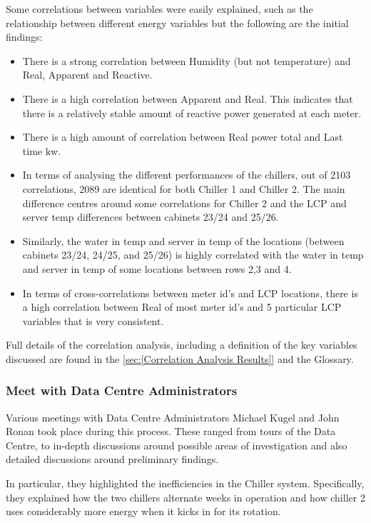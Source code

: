\documentclass[12pt]{scrartcl}
\begin{document}
Some correlations between variables were easily explained, such as the relationship between different energy variables but the following are the initial findings:    

\begin{itemize}
\item There is a strong correlation between Humidity (but not temperature) and \gls{Real}, \Gls{Apparent} and \Gls{Reactive}.
\item There is a high correlation between \Gls{Apparent} and \Gls{Real}. This indicates that there is a relatively stable amount of reactive power generated at each meter.
\item There is a high amount of correlation between Real power total and Last time kw.
\item In terms of analysing the different performances of the chillers, out of 2103 correlations, 2089 are identical for both Chiller 1 and Chiller 2. The main difference centres around some correlations for Chiller 2 and the \gls{LCP} and server temp differences between cabinets 23/24 and 25/26.
\item Similarly, the water in temp and server in temp of the locations (between cabinets 23/24, 24/25, and 25/26) is highly correlated with the water in temp and server in temp of some locations between rows 2,3 and 4.
\item In terms of cross-correlations between meter id’s and LCP locations, there is a high correlation between \Gls{Real} of most meter id’s and 5 particular \gls{LCP} variables that is very consistent.
\end{itemize}  

Full details of the correlation analysis, including a definition of the key variables discussed are found in the \ref{sec:[Correlation Analysis Results]} and the Glossary. 

\subsubsection{Meet with Data Centre Administrators}
\label{subsubsec:[Meet with Data Centre Administrators]}

Various meetings with Data Centre Administrators Michael Kugel and John Ronan took place during this process. These ranged from tours of the Data Centre, to in-depth discussions around possible areas of investigation and also detailed discussions around preliminary findings. 

In particular, they highlighted the inefficiencies in the Chiller system. Specifically, they explained how the two chillers alternate weeks in operation and how chiller 2 uses considerably more energy when it kicks in for its rotation.
\end{document}
